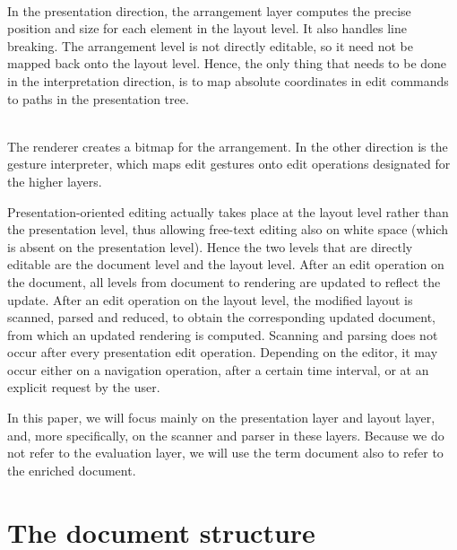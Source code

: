 \documentclass[12pt]{article}
\begin{document}
\\
In the presentation direction, the arrangement layer computes the precise position and size for each element in the layout level. It also handles line breaking. The arrangement level is not directly editable, so it need not be mapped back onto the layout level. Hence, the only thing that needs to be done in the interpretation direction, is to map absolute coordinates in edit commands to paths in the presentation tree. 

\\
The renderer creates a bitmap for the arrangement. In the other direction is the gesture interpreter, which maps edit gestures onto edit operations designated for the higher layers.

\ec





Presentation-oriented editing actually takes place at the layout level rather than the presentation level, thus allowing free-text editing also on white space (which is absent on the presentation level). Hence the two levels that are directly editable are the document level and the layout level. After an edit operation on the document, all levels from document to rendering are updated to reflect the update. After an edit operation on the layout level, the modified layout is scanned, parsed and reduced, to obtain the corresponding updated document, from which an updated rendering is computed. Scanning and parsing does not occur after every presentation edit operation. Depending on the editor, it may occur either on a navigation operation, after a certain time interval, or at an explicit request by the user.

In this paper, we will focus mainly on the presentation layer and layout layer, and, more specifically, on the scanner and parser in these layers. Because we do not refer to the evaluation layer, we will use the term document also to refer to the enriched document. 



%
\section{The document structure}\label{sect:documentStructure}
%
\end{document}
